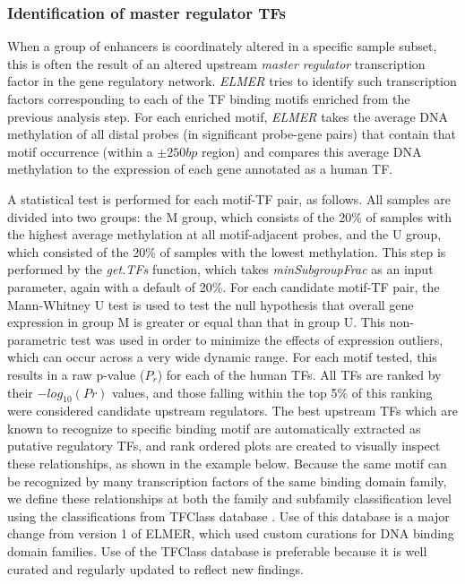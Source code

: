 
\subsubsection*{Identification of master regulator TFs}

When a group of enhancers is coordinately altered in a specific sample subset, this is often the result of an altered upstream \textit{master regulator} transcription factor in the gene regulatory network. \textit{ELMER} tries to identify such transcription factors corresponding to each of the TF binding motifs enriched from the previous analysis step.
For each enriched motif, \textit{ELMER} takes the average DNA methylation of all distal probes (in significant probe-gene pairs) that contain that motif occurrence (within a $\pm 250bp$ region) and compares this average DNA methylation to the expression of each gene annotated as a human TF.

A statistical test is performed for each motif-TF pair, as follows. All samples 
are divided into two groups: the M group, which consists 
of the 20\% of samples with the highest average methylation at all motif-adjacent
probes, and the U group, which consisted of the 20\%  of samples with the lowest 
methylation. This step is performed by the \textit{get.TFs} function, which takes \textit{minSubgroupFrac} as an input parameter, again with a default of 20\%.
For each candidate motif-TF pair, the Mann-Whitney U test is used to test 
the null hypothesis that overall gene expression in group M is greater or equal 
than that in group U. This non-parametric test was used in order to minimize the 
effects of expression outliers, which can occur across a very wide dynamic range. 
For each motif tested, this results in a raw p-value ($P_r$) for each of the human TFs.
All TFs are ranked by their $-log_{10}(Pr)$ values, and those falling within the top 5\% of 
this ranking were considered candidate upstream regulators. The best upstream 
TFs which are known to recognize to specific binding motif are automatically extracted as putative 
regulatory TFs, and rank ordered plots are created to visually inspect these relationships, as shown in the example below. Because the same motif can be recognized by many transcription factors of the same binding domain family, we define these relationships at both the family and subfamily classification level using the 
classifications from TFClass database \cite{wingender2013tfclass}. Use of this database is a major change from version 1 of ELMER, which used custom curations for DNA binding domain families. Use of the TFClass database is preferable because it is well curated and regularly updated to reflect new findings.




